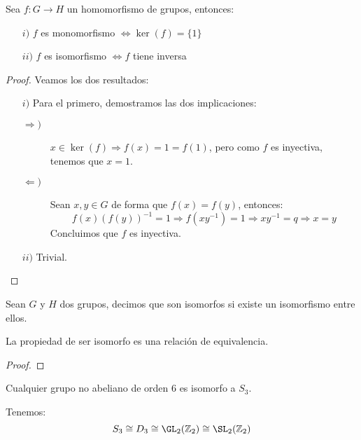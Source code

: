\begin{prop}
    Sea $f:G\to H$ un homomorfismo de grupos, entonces:
    \begin{enumerate}
        \item[$i)$] $f$ es monomorfismo $\Longleftrightarrow \ker(f)=\{1\}$
        \item[$ii)$] $f$ es isomorfismo $\Longleftrightarrow f$ tiene inversa
    \end{enumerate}
    \begin{proof}
            Veamos los dos resultados:
        \begin{enumerate}
            \item[$i)$] Para el primero, demostramos las dos implicaciones:
                \begin{description}
                    \item [$\Longrightarrow)$] $x\in \ker(f) \Longrightarrow f(x) = 1 = f(1)$, pero como $f$ es inyectiva, tenemos que $x=1$.
                    \item [$\Longleftarrow)$] Sean $x,y\in G$ de forma que $f(x)=f(y)$, entonces:
                        \begin{equation*}
                            f(x){(f(y))}^{-1} = 1 \Longrightarrow f(xy^{-1}) = 1 \Longrightarrow xy^{-1} = q \Longrightarrow x = y
                        \end{equation*}
                        Concluimos que $f$ es inyectiva.
                \end{description}
            \item[$ii)$] Trivial.
        \end{enumerate}
    \end{proof}
\end{prop}

\begin{definicion}
    Sean $G$ y $H$ dos grupos, decimos que son isomorfos si existe un isomorfismo entre ellos.
\end{definicion}

\begin{prop}
    La propiedad de ser isomorfo es una relación de equivalencia.
    \begin{proof}
    \end{proof}
\end{prop}

\begin{teo}[de clasificación]
    
\end{teo}

Cualquier grupo no abeliano de orden 6 es isomorfo a $S_3$.

\begin{ejemplo}
    Tenemos:
    \begin{equation*}
        S_3 \cong D_3 \cong \GL_2(\mathbb{Z}_2) \cong \SL_2(\mathbb{Z}_2)
    \end{equation*}
\end{ejemplo}
